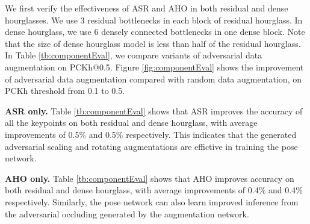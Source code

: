 \documentclass[10pt,twocolumn,letterpaper]{article}
\begin{document}

We first verify the effectiveness of ASR and AHO in both residual and dense hourglasses. We use 3 residual bottlenecks in each block of residual hourglass. In dense hourglass, we use 6 densely connected bottlenecks in one dense block. Note that the size of dense hourglass model is less than half of the residual hourglass. In Table \ref{tb:componentEval}, we compare variants of adversarial data augmentation on PCKh@0.5. Figure \ref{fig:componentEval} shows the improvement of adversarial data augmentation compared with random data augmentation, on PCKh threshold from 0.1 to 0.5.

{\bf ASR only.} Table \ref{tb:componentEval} shows that ASR %
improves the accuracy of all the keypoints on both residual and dense hourglass, with average improvements of 0.5\% and 0.5\% respectively. This indicates that the generated adversarial scaling and rotating augmentations are effictive in training the pose network. 

{\bf AHO only.} Table \ref{tb:componentEval} shows that AHO %
improves accuracy on both residual and dense hourglass, with average improvements of 0.4\% and 0.4\% respectively. Similarly, the pose network can also learn improved inference from the adversarial occluding generated by the augmentation network.
\end{document}
